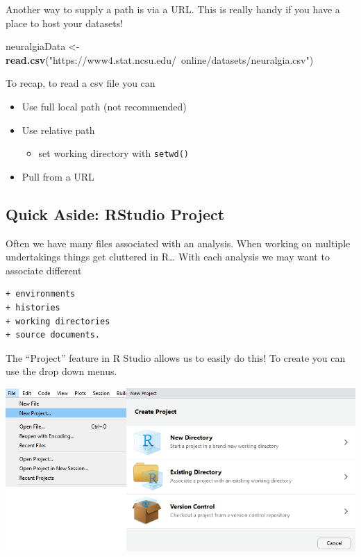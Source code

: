 \documentclass[
]{book}
\newenvironment{Shaded}{\begin{snugshade}}{\end{snugshade}}
\newcommand{\KeywordTok}[1]{\textcolor[rgb]{0.13,0.29,0.53}{\textbf{#1}}}
\newcommand{\NormalTok}[1]{#1}
\newcommand{\StringTok}[1]{\textcolor[rgb]{0.31,0.60,0.02}{#1}}
\providecommand{\tightlist}{%
  \setlength{\itemsep}{0pt}\setlength{\parskip}{0pt}}
\theoremstyle{definition}
\theoremstyle{definition}
\theoremstyle{definition}
\theoremstyle{remark}
\begin{document}
Another way to supply a path is via a URL. This is really handy if you have a place to host your datasets!

\begin{Shaded}
\begin{Highlighting}[]
\NormalTok{neuralgiaData <-}\StringTok{ }\KeywordTok{read.csv}\NormalTok{(}\StringTok{"https://www4.stat.ncsu.edu/~online/datasets/neuralgia.csv"}\NormalTok{)}
\end{Highlighting}
\end{Shaded}

To recap, to read a csv file you can

\begin{itemize}
\item
  Use full local path (not recommended)
\item
  Use relative path

  \begin{itemize}
  \tightlist
  \item
    set working directory with \texttt{setwd()}
  \end{itemize}
\item
  Pull from a URL
\end{itemize}

\hypertarget{quick-aside-rstudio-project}{%
\subsection{Quick Aside: RStudio Project}\label{quick-aside-rstudio-project}}

Often we have many files associated with an analysis. When working on multiple undertakings things get cluttered in R\ldots{} With each analysis we may want to associate different

\begin{verbatim}
+ environments  
+ histories  
+ working directories  
+ source documents.  
\end{verbatim}

The ``Project'' feature in R Studio allows us to easily do this! To create you can use the drop down menus.

\begin{center}\includegraphics[width=0.8\linewidth]{img/project} \end{center}
\end{document}
